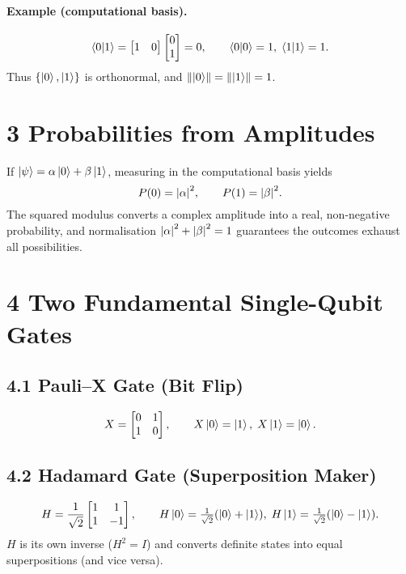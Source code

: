 \documentclass[12pt]{article}
\begin{document}
\paragraph{Example (computational basis).}
\[
   \braket{0}{1}
   =\begin{bmatrix}1&0\end{bmatrix}
     \begin{bmatrix}0\\1\end{bmatrix}
   =0,
   \qquad
   \braket{0}{0}=1,\;
   \braket{1}{1}=1.
\]
Thus \(\{\ket{0},\ket{1}\}\) is orthonormal, and
\(\norm{\ket{0}}=\norm{\ket{1}}=1\).

\section*{3 \quad Probabilities from Amplitudes}

If \(\ket{\psi}=\alpha\ket{0}+\beta\ket{1}\), measuring in the
computational basis yields
\[
   P(0)=\abs{\alpha}^{2},\qquad
   P(1)=\abs{\beta}^{2}.
\]
The squared modulus converts a complex amplitude into a real,
non-negative probability, and normalisation
\(\abs{\alpha}^{2}+\abs{\beta}^{2}=1\) guarantees the outcomes exhaust
all possibilities.

\section*{4 \quad Two Fundamental Single-Qubit Gates}

\subsection*{4.1 \quad Pauli–X Gate (Bit Flip)}
\[
   X =
   \begin{bmatrix}
     0 & 1\\
     1 & 0
   \end{bmatrix},
   \qquad
   X\ket{0}=\ket{1},\;
   X\ket{1}=\ket{0}.
\]

\subsection*{4.2 \quad Hadamard Gate (Superposition Maker)}
\[
   H =
   \frac{1}{\sqrt{2}}
   \begin{bmatrix}
     1 &  1\\
     1 & -1
   \end{bmatrix},
   \qquad
   H\ket{0}=\tfrac1{\sqrt2}(\ket{0}+\ket{1}),\;
   H\ket{1}=\tfrac1{\sqrt2}(\ket{0}-\ket{1}).
\]
\(H\) is its own inverse (\(H^{2}=I\)) and converts definite states into
equal superpositions (and vice versa).
\end{document}
